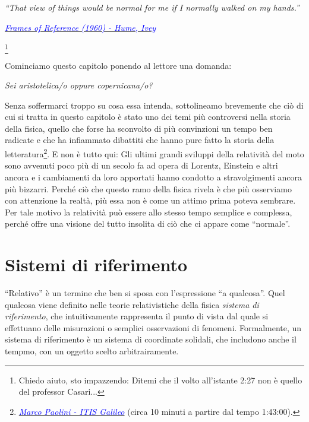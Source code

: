 \marginpar{\minitoc}

\epigraph{\emph{``That view of things would be normal for me if I normally walked on my hands.''}}{\href{https://www.youtube.com/watch?v=bJMYoj4hHqU}{\textcolor{blue}{\textit{Frames of Reference (1960) - Hume, Ivey\footnotemark[1]}}}}\footnote{Chiedo aiuto, sto impazzendo: Ditemi che il volto all'istante 2:27 non è quello del professor Casari...}

Cominciamo questo capitolo ponendo al lettore una domanda:

\begin{center}
    \textit{Sei aristotelica/o oppure copernicana/o?}
\end{center}

\noindent Senza soffermarci troppo su cosa essa intenda,
sottolineamo brevemente che ciò di cui si tratta in questo capitolo
è stato uno dei temi più controversi nella storia della fisica, quello
che forse ha sconvolto di più convinzioni un tempo ben radicate e
che ha infiammato dibattiti che hanno pure fatto la storia della
letteratura\footnote{\href{https://youtu.be/0kxarmulkiA?feature=shared&t=6180}{\textcolor{blue}{\textit{Marco Paolini - ITIS Galileo}}} (circa 10 minuti a partire dal tempo 1:43:00).}. E non è tutto qui: Gli ultimi grandi sviluppi della relatività
del moto sono avvenuti poco più di un secolo fa ad opera di Lorentz, Einstein
e altri ancora e i cambiamenti da loro apportati hanno condotto a
stravolgimenti ancora più bizzarri. Perché ciò che questo ramo della
fisica rivela è che più osserviamo con attenzione la realtà, più essa non
è come un attimo prima poteva sembrare. Per tale motivo la relatività può
essere allo stesso tempo semplice e complessa, perché offre una visione
del tutto insolita di ciò che ci appare come ``normale''.


\section{Sistemi di riferimento}
``Relativo'' è un termine che ben si sposa con l'espressione ``a qualcosa''.
Quel qualcosa viene definito nelle teorie relativistiche della fisica
\textit{sistema di riferimento}, che intuitivamente rappresenta il punto di
vista dal quale si effettuano delle misurazioni o semplici osservazioni di
fenomeni. Formalmente, un sistema di riferimento è un sistema di coordinate
solidali, che includono anche il tempmo, con un oggetto scelto arbitrairamente.

